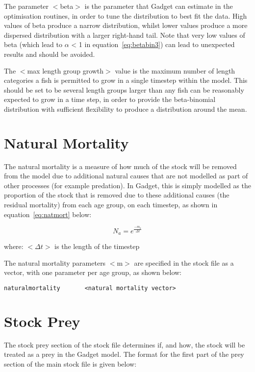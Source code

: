 \documentclass[10pt,twoside]{book}
\begin{document}
The parameter $<$beta$>$ is the parameter that Gadget can estimate in the optimisation routines, in order to tune the distribution to best fit the data.  High values of beta produce a narrow distribution, whilst lower values produce a more dispersed distribution with a larger right-hand tail.  Note that very low values of beta (which lead to $\alpha$ < 1 in equation~\ref{eq:betabin3}) can lead to unexpected results and should be avoided.

\bigskip
The $<$max length group growth$>$ value is the maximum number of length categories a fish is permitted to grow in a single timestep within the model.  This should be set to be several length groups larger than any fish can be reasonably expected to grow in a time step, in order to provide the beta-binomial distribution with sufficient flexibility to produce a distribution around the mean.

\section{Natural Mortality}\label{sec:stocknatmort}
The natural mortality is a measure of how much of the stock will be removed from the model due to additional natural causes that are not modelled as part of other processes (for example predation).  In Gadget, this is simply modelled as the proportion of the stock that is removed due to these additional causes (the residual mortality) from each age group, on each timestep, as shown in equation~\ref{eq:natmort} below:

\begin{equation}\label{eq:natmort}
N_{a} = e^{\displaystyle \frac{-m_{a}} {\Delta t}}
\end{equation}

where:\newline
$<\Delta t>$ is the length of the timestep

\bigskip
The natural mortality parameters $<$m$>$ are specified in the stock file as a vector, with one parameter per age group, as shown below:

{\small\begin{verbatim}
naturalmortality       <natural mortality vector>
\end{verbatim}}

\section{Stock Prey}\label{sec:stockprey}
The stock prey section of the stock file determines if, and how, the stock will be treated as a prey in the Gadget model.  The format for the first part of the prey section of the main stock file is given below:
\end{document}
